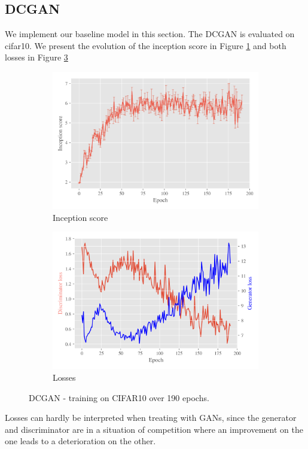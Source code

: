 \subsection{DCGAN}
\label{sec:exp-dcgan}

We implement our baseline model in this section. The DCGAN is evaluated on cifar10. We present the evolution of the inception score in Figure \ref{fig:exp-dcgan-is} and both losses in Figure \ref{fig:exp-dcgan-losses}
   
\begin{figure}[t!]
    \centering
    \begin{subfigure}[t]{0.49\textwidth}
        \centering
		\includegraphics[width=\textwidth]{../code/results/figures/dcgan_cifar10_is.png}
		\caption{Inception score}
		\label{fig:exp-dcgan-is}
    \end{subfigure}
    \begin{subfigure}[t]{0.49\textwidth}
        \centering
        \includegraphics[width=\textwidth]{../code/results/figures/dcgan_cifar10_losses.png}
		\caption{Losses}
		\label{fig:exp-dcgan-losses}
    \end{subfigure}
    \caption{DCGAN - training on CIFAR10 over 190 epochs.}
\end{figure}

Losses can hardly be interpreted when treating with GANs, since the generator and discriminator are in a situation of competition where an improvement on the one leads to a deterioration on the other.

